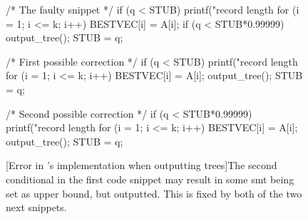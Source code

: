 \begin{figure}[htbp]
\begin{c-code}
/* The faulty snippet */
if (q < STUB) {
  printf("\nnew record length %
  for (i = 1; i <= k; i++) BESTVEC[i] = A[i];
  if (q < STUB*0.99999) output_tree();
  STUB = q;
}

/* First possible correction */
if (q < STUB) {
  printf("\nnew record length %
  for (i = 1; i <= k; i++) BESTVEC[i] = A[i];
  output_tree();
  STUB = q;
}

/* Second possible correction */
if (q < STUB*0.99999) {
  printf("\nnew record length %
  for (i = 1; i <= k; i++) BESTVEC[i] = A[i];
  output_tree();
  STUB = q;
}
\end{c-code}
  [Error in \citeauthor{smith1992}'s implementation when outputting trees]{The
    second conditional in the first code snippet may result in some \ac{smt}
    being set as upper bound, but outputted. This is fixed by both of the two
    next snippets.\label{fig:if-clause-snippet}}
\end{figure}

\chapterbreak{}

